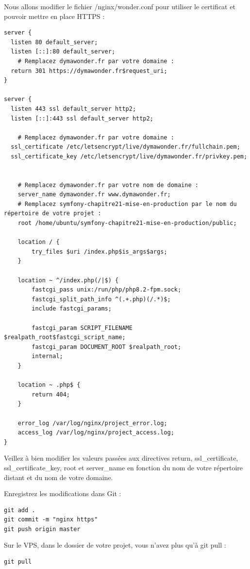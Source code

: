 \documentclass{article}
\begin{document}
Nous allons modifier le fichier /nginx/wonder.conf pour utiliser le certificat et pouvoir mettre en place HTTPS :
\begin{verbatim}
server {
  listen 80 default_server;
  listen [::]:80 default_server;
    # Remplacez dymawonder.fr par votre domaine :
  return 301 https://dymawonder.fr$request_uri;
}

server {
  listen 443 ssl default_server http2;
  listen [::]:443 ssl default_server http2;

    # Remplacez dymawonder.fr par votre domaine :
  ssl_certificate /etc/letsencrypt/live/dymawonder.fr/fullchain.pem;
  ssl_certificate_key /etc/letsencrypt/live/dymawonder.fr/privkey.pem;


    # Remplacez dymawonder.fr par votre nom de domaine :
    server_name dymawonder.fr www.dymawonder.fr;
    # Remplacez symfony-chapitre21-mise-en-production par le nom du répertoire de votre projet :
    root /home/ubuntu/symfony-chapitre21-mise-en-production/public;

    location / {
        try_files $uri /index.php$is_args$args;
    }

    location ~ ^/index.php(/|$) {
        fastcgi_pass unix:/run/php/php8.2-fpm.sock;
        fastcgi_split_path_info ^(.+.php)(/.*)$;
        include fastcgi_params;

        fastcgi_param SCRIPT_FILENAME $realpath_root$fastcgi_script_name;
        fastcgi_param DOCUMENT_ROOT $realpath_root;
        internal;
    }

    location ~ .php$ {
        return 404;
    }

    error_log /var/log/nginx/project_error.log;
    access_log /var/log/nginx/project_access.log;
}

\end{verbatim}
Veillez à bien modifier les valeurs passées aux directives return, ssl\_certificate, ssl\_certificate\_key, root et server\_name en fonction du nom de votre répertoire distant et du nom de votre domaine.

Enregistrez les modifications dans Git :
\begin{verbatim}
git add .
git commit -m "nginx https"
git push origin master
\end{verbatim}

Sur le VPS, dans le dossier de votre projet, vous n'avez plus qu'à git pull :
\begin{verbatim}
git pull
\end{verbatim}
\end{document}
